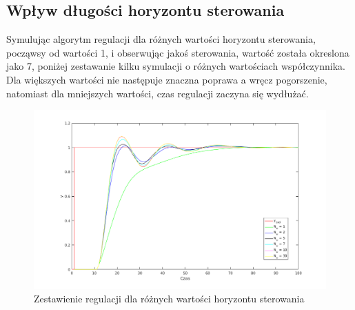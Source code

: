 \documentclass[a4paper, 11pt]{article}
\begin{document}
\subsection{Wpływ długości horyzontu sterowania}
Symulując algorytm regulacji dla różnych wartości horyzontu sterowania, począwsy od wartości 1, i obserwując jakoś sterowania, wartość została okreslona jako 7, poniżej zestawanie kilku symulacji o różnych wartościach współczynnika. Dla większych wartości nie następuje znaczna poprawa a wręcz pogorszenie, natomiast dla mniejszych wartości, czas regulacji zaczyna się wydłużać. 
\begin{figure}[H]
\centering
\includegraphics[scale=0.60]{horyzont_sterowania.png}
\caption{Zestawienie regulacji dla różnych wartości horyzontu sterowania}
\label{}
\end{figure}
\end{document}
